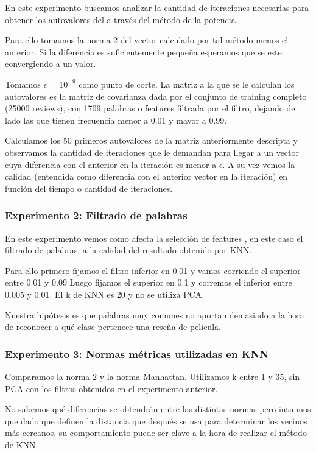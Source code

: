 En este experimento buscamos analizar la cantidad de iteraciones necesarias para obtener los autovalores del a través del método de la potencia.

Para ello tomamos la norma 2 del vector calculado por tal método menos el anterior. Si la diferencia es suficientemente pequeña esperamos que se este convergiendo a un valor.

Tomamos $\epsilon$ = $10^{-9}$ como punto de corte. La matriz a la que se le calculan los autovalores es la matriz de covarianza dada por el conjunto de training completo (25000 reviews), con 1709 palabras o features filtrada por el filtro, dejando de lado las que tienen frecuencia menor a 0.01 y mayor a 0.99.

Calculamos los 50 primeros autovalores de la matriz anteriormente descripta y observamos la cantidad de iteraciones que le demandan para llegar a un vector cuya diferencia con el anterior en la iteración es menor a $\epsilon$. A su vez vemos la calidad (entendida como diferencia con el anterior vector en la iteración) en función del tiempo o cantidad de iteraciones.

\subsubsection{Experimento 2: Filtrado de palabras}

En este experimento vemos como afecta la selección de features , en este caso el filtrado de palabras, a la calidad del resultado obtenido por KNN. 

Para ello primero fijamos el filtro inferior en 0.01 y vamos corriendo el superior entre 0.01 y 0.09
Luego fijamos el superior en 0.1 y corremos el inferior entre 0.005 y 0.01. El k de KNN  es 20 y no se utiliza PCA. 

Nuestra hipótesis es que palabras muy comunes no aportan demasiado a la hora de reconocer a qué clase pertenece una reseña de película.

\subsubsection{Experimento 3: Normas métricas utilizadas en KNN}

Comparamos la norma 2 y la norma Manhattan. Utilizamos k entre 1 y 35, sin PCA con los filtros obtenidos en el experimento anterior. 

No sabemos qué diferencias se obtendrán entre las distintas normas pero intuimos que dado que definen la distancia que después se usa para determinar  los vecinos más cercanos, su comportamiento puede ser clave a la hora de realizar el método de KNN.

